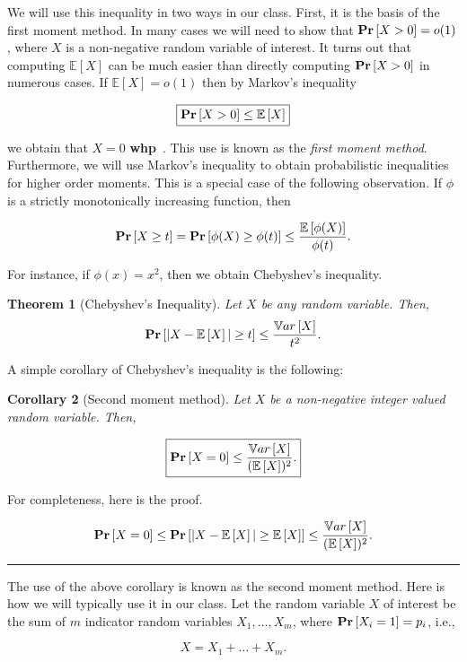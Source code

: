 \documentclass[twoside]{article}
\newcounter{lecnum}
\newtheorem{theorem}{Theorem}[lecnum]
\newtheorem{corollary}[theorem]{Corollary}
\newenvironment{proof}{{\bf Proof:}}{\hfill\rule{2mm}{2mm}}
\newcommand{\whp}{{\bf whp}\ }
\newcommand{\Prob}[1]{{{\bf{Pr}}\left[{#1}\right]}}
\newcommand{\Mean}[1]{{\mathbb E}\left[{#1}\right]}
\newcommand{\Var}[1]{{\mathbb Var}\left[{#1}\right]}
\begin{document}
We will use this inequality in two ways in our class. First, it is the basis of the first moment
method. In many cases we will need to show that $\Prob{X>0}=o(1)$,  where $X$ is a non-negative 
random variable of interest. It turns out that computing $\Mean{X}$ can be much easier than 
directly computing $\Prob{X>0}$  in numerous
cases. 
If $\Mean{X}=o(1)$ then by Markov's inequality

 \[
 \boxed{\Prob{X>0}\leq \Mean{X}}
 \]
 
\noindent we obtain that $X=0$ \whp.  This use is known as the {\em first moment method}. 
Furthermore, we will use Markov's inequality to obtain probabilistic inequalities 
for higher order moments.  This is a special case of the following observation. 
If $\phi$ is a strictly monotonically increasing function, then 

$$ \Prob{ X \geq t} = \Prob{\phi(X) \geq \phi(t) } \leq \frac{ \Mean{ \phi(X) } }{\phi(t)}.$$ 

For instance, if $\phi(x)=x^2$, then we obtain Chebyshev's inequality. 

\begin{theorem}[Chebyshev's Inequality] 
Let $X$ be {\it any} random variable. Then,
$$ \Prob{ |X-\Mean{X}| \geq t} \leq \frac{\Var{X}}{t^2}.$$
\end{theorem}


A simple corollary of Chebyshev's inequality   
is the following: 

\begin{corollary}[Second moment method] 
Let $X$ be a non-negative integer valued random variable. Then, 

 \[
 \boxed{\Prob{X=0} \leq \frac{ \Var{X} } { (\Mean{X})^2 }.}
 \]
 
 
\end{corollary}

For completeness, here is the proof.

\begin{proof}
$$\Prob{X = 0}  \leq \Prob{ |X - \Mean{X}| \geq \Mean{X} } \leq \frac{ \Var{X} }{ (\Mean{X})^2 }.$$
\end{proof}


The use of the above corollary is known as the second moment method. 
Here is how we will typically use it in our class. 
Let the random variable $X$ of interest be the sum of $m$ indicator
random variables $X_1,\ldots,X_m$, where $\Prob{X_i=1}=p_i$, i.e.,

$$ X = X_1 + \ldots + X_m.$$ 
\end{document}
